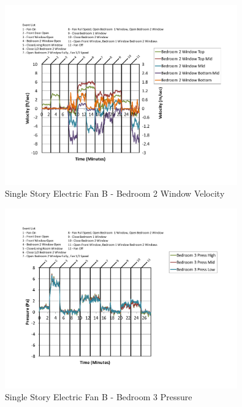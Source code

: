 \documentclass{article}
\begin{document}
\begin{appendices}
	\begin{figure}[H]
		\centering
		\includegraphics[height=3.05in,trim=0.67in 1.1in 0.67in 0.8in,clip=true]{0_Images/Results_Charts/ColdFlow/Single_Story/Electric/B/Bedroom_2_Window_Velocity.pdf}
		\caption{Single Story Electric Fan B - Bedroom 2 Window Velocity}
	\end{figure}
 

	\begin{figure}[H]
		\centering
		\includegraphics[height=3.05in,trim=0.67in 1.1in 0.67in 0.8in,clip=true]{0_Images/Results_Charts/ColdFlow/Single_Story/Electric/B/Bedroom_3_Pressure.pdf}
		\caption{Single Story Electric Fan B - Bedroom 3 Pressure}
	\end{figure}
 
	\clearpage


\end{appendices}
\end{document}
